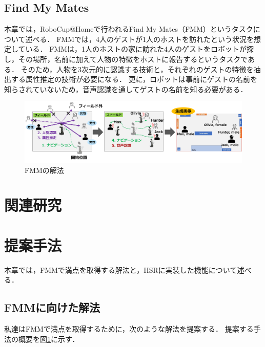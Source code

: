 \documentclass[a4j]{jarticle}
\begin{document}
\subsection{Find My Mates}
本章では，RoboCup@Homeで行われるFind My Mates（FMM）というタスクについて述べる．
FMMでは，4人のゲストが1人のホストを訪れたという状況を想定している．
FMMは，1人のホストの家に訪れた4人のゲストをロボットが探し，その場所，名前に加えて人物の特徴をホストに報告するというタスクである．
そのため，人物を3次元的に認識する技術と，それぞれのゲストの特徴を抽出する属性推定の技術が必要になる．
更に，ロボットは事前にゲストの名前を知らされていないため，音声認識を通してゲストの名前を知る必要がある．
\begin{figure}[ht]
  \centering
  \includegraphics[width=16cm]{images/FMM/solution_overview_yoko_yy2.png}
  \caption{FMMの解法}
  \label{solution_overview}
\end{figure}

\section{関連研究}


\section{提案手法}
本章では，FMMで満点を取得する解法と，HSRに実装した機能について述べる．

\subsection{FMMに向けた解法}
私達はFMMで満点を取得するために，次のような解法を提案する．
提案する手法の概要を図\ref{solution_overview}に示す．
\end{document}
